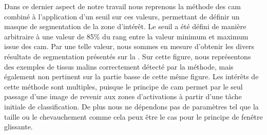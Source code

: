 Dans ce dernier aspect de notre travail nous reprenons la méthode des \gls{cam} combiné à l'application d'un seuil sur ces valeurs, permettant de définir un masque de segmentation de la zone d'intérêt. Le seuil a été défini de manière arbitraire à une valeur de 85\% du rang entre la valeur minimum et maximum issue des \gls{cam}. Par une telle valeur, nous sommes en mesure d'obtenir les divers résultats de segmentation présentés sur la . Sur cette figure, nous représentons des exemples de tissus malins correctement détecté par la méthode, mais également non pertinent sur la partie basse de cette même figure. Les intérêts de cette méthode sont multiples, puisque le principe de \gls{cam} permet par le seul passage d'une image de revenir aux zones d'activations à partir d'une tâche initiale de classification. De plus nous ne dépendons pas de paramètres tel que la taille ou le chevauchement comme cela peux être le cas pour le principe de fenêtre glissante.\par

